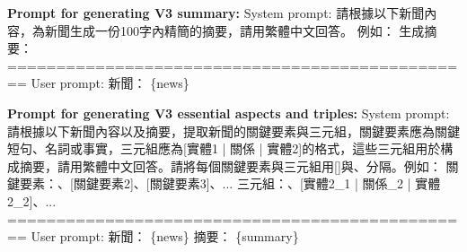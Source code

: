 \documentclass[preprint,12pt]{elsarticle}
\begin{document}
\noindent
\textbf{Prompt for generating V3 summary:}\newline
{
\small
\noindent
System prompt:\newline
請根據以下新聞內容，為新聞生成一份100字內精簡的摘要，請用繁體中文回答。\newline
例如：\newline
生成摘要：\newline
================================================\newline
User prompt:\newline
新聞：\newline
\{news\}\newline
\newline
}

\noindent
\textbf{Prompt for generating V3 essential aspects and triples:}\newline
{
\small
\noindent
System prompt:\newline
請根據以下新聞內容以及摘要，提取新聞的關鍵要素與三元組，關鍵要素應為關鍵短句、名詞或事實，三元組應為[實體1 | 關係 | 實體2]的格式，這些三元組用於構成摘要，請用繁體中文回答。請將每個關鍵要素與三元組用[]與、分隔。例如：\newline
關鍵要素：\newline
[關鍵要素1]、[關鍵要素2]、[關鍵要素3]、...\newline
\newline
三元組：\newline
[實體1\_1 | 關係\_1 | 實體1\_2]、[實體2\_1 | 關係\_2 | 實體2\_2]、...\newline
================================================\newline
User prompt:\newline
新聞：\newline
\{news\}\newline
\noindent
摘要：\newline
\{summary\}\newline
\newline
}
\end{document}
